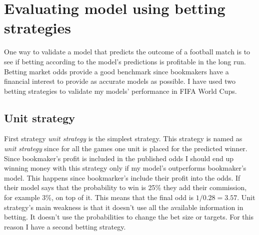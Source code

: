 \section{Evaluating model using betting strategies}
One way to validate a model that predicts the outcome of a football match is to see if betting according to the model's predictions is profitable in the long run. Betting market odds provide a good benchmark since bookmakers have a financial interest to provide as accurate models as possible. I have used two betting strategies to validate my models' performance in FIFA World Cups.

\subsection{Unit strategy}
First strategy \textit{unit strategy} is the simplest strategy. This strategy is named as \textit{unit strategy} since for all the games one unit is placed for the predicted winner. Since bookmaker's profit is included in the published odds I should end up winning money with this strategy only if my model's outperforms bookmaker's model. This happens since bookmarker's include their profit into the odds. If their model says that the probability to win is 25\% they add their commission, for example 3\%, on top of it. This means that the final odd is $1/0.28 = 3.57$. Unit strategy's main weakness is that it doesn't use all the available information in betting. It doesn't use the probabilities to change the bet size or targets. For this reason I have a second betting strategy.

